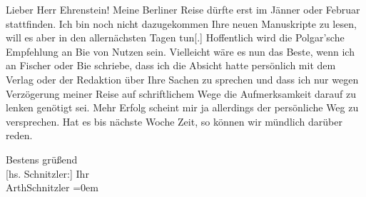 \pstart{}Lieber Herr Ehrenstein!\pend\vspace{0.5em}
\pstart
           Meine Berliner Reise dürfte erst im
                  Jänner oder Februar stattfinden. Ich bin noch nicht
               dazugekommen Ihre neuen Manuskripte zu lesen, will es aber in den allernächsten Tagen
                  tun{[}.{]} Hoffentlich  wird die Polgar’sche Empfehlung an Bie von Nutzen sein. Vielleicht wäre es nun das Beste, wenn ich an Fischer oder Bie schriebe, dass ich die Absicht hatte persönlich mit dem Verlag oder der Redaktion über Ihre Sachen zu sprechen und
               dass ich nur wegen Verzögerung meiner Reise auf schriftlichem Wege die Aufmerksamkeit
               darauf zu lenken genötigt sei. Mehr Erfolg scheint mir ja allerdings der persönliche
               Weg zu versprechen. Hat es bis nächste Woche Zeit, so können wir mündlich darüber
               reden.\pend
           
\pstart
           Bestens grüßend{\\[\baselineskip]}{[}hs. Schnitzler:{]} Ihr{\\[\baselineskip]}\spacefill\mbox{ArthSchnitzler}\pend
           \leftskip=0em{}\endnumbering{}  \newcommand{\dateiname}{L01888}\newcommand{\titel}{Arthur Schnitzler an Albert Ehrenstein, 23. 11. 1909}\newcommand{\editorInnen}{Martin Anton Müller und Gerd-Hermann Susen}

